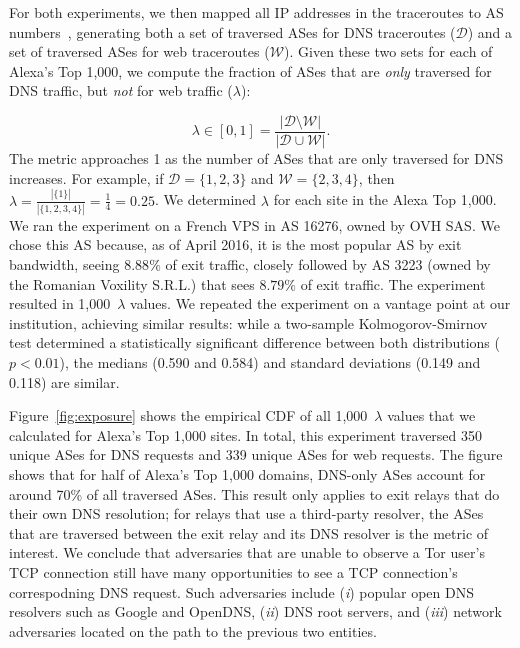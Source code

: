 For both experiments, we then mapped all IP addresses in the traceroutes to AS
numbers~\cite{ipasn}, generating both a set of traversed ASes for DNS traceroutes
($\mathcal{D}$) and a set of traversed ASes for web traceroutes
($\mathcal{W}$).  Given these two sets for each of Alexa's Top
1,000, we compute the fraction of ASes that are \emph{only}
traversed for DNS traffic, but \emph{not} for web traffic ($\lambda$):

\begin{equation}
\label{equ:exposure}
\lambda \in [0, 1] =
\frac{|\mathcal{D} \setminus \mathcal{W}|}
     {|\mathcal{D} \cup \mathcal{W}|}.
\end{equation}
\noindent
The metric approaches 1 as the number of ASes that are only traversed for DNS
increases.  For example, if $\mathcal{D} = \{1,2,3\}$ and $\mathcal{W} =
\{2,3,4\}$, then $\lambda = \frac{|\{1\}|}{|\{1,2,3,4\}|} = \frac{1}{4} =
0.25$.  We determined $\lambda$ for each site in the Alexa Top 1,000.  We ran
the experiment on a French VPS in AS 16276, owned by OVH SAS.  We chose this AS
because, as of April 2016, it is the most popular AS by exit bandwidth, seeing
$8.88\%$ of exit traffic, closely followed by AS 3223 (owned by the Romanian
Voxility S.R.L.) that sees $8.79\%$ of exit traffic.  The experiment resulted in
1,000~$\lambda$ values.  We repeated the experiment on a vantage point at our
institution, achieving similar results: while a two-sample Kolmogorov-Smirnov
test determined a statistically significant difference between both
distributions ($p < 0.01$), the medians (0.590 and 0.584) and standard
deviations (0.149 and 0.118) are similar.

Figure~\ref{fig:exposure} shows the empirical CDF of all 1,000~$\lambda$ values
that we calculated for Alexa's Top 1,000 sites.  In total, this experiment
traversed 350 unique ASes for DNS requests and 339 unique ASes for web requests.
The figure shows that for half of Alexa's Top 1,000 domains, DNS-only ASes
account for around 70\% of all traversed ASes.  This result
only applies to exit relays that do their own DNS resolution; for relays that
use a third-party resolver, the ASes that are traversed between
the exit relay and its DNS resolver is the metric of interest.  We conclude that adversaries that are
unable to observe a Tor user's TCP connection still have many opportunities to
see a TCP connection's correspodning DNS request.  Such adversaries include (\emph{i}) popular open
DNS resolvers such as Google and OpenDNS, (\emph{ii}) DNS root servers, and
(\emph{iii}) network adversaries located on the path to the previous two
entities.

